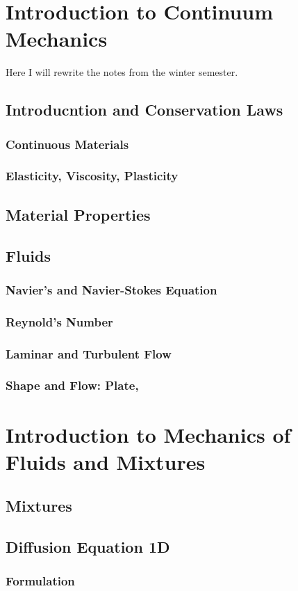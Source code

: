 \chapter{Introduction to Continuum Mechanics}

Here I will rewrite the notes from the winter semester.

\section{Introducntion and Conservation Laws}
\subsection{Continuous Materials}
\subsection{Elasticity, Viscosity, Plasticity}
\subsection{}

\section{Material Properties}

\section{Fluids}
\subsection{Navier's and Navier-Stokes Equation}
\subsection{Reynold's Number}
\subsection{Laminar and Turbulent Flow}
\subsection{Shape and Flow: Plate, }

\chapter{Introduction to Mechanics of Fluids and Mixtures}

\section{Mixtures}

\section{Diffusion Equation 1D}

\subsection{Formulation}

